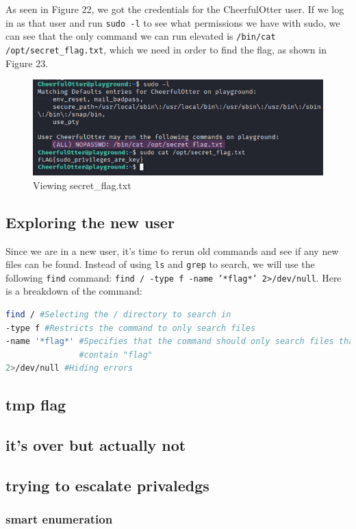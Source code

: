 \documentclass[a4paper]{article}
\newcommand{\abc}{\hfill \break}
\begin{document}
As seen in Figure 22, we got the credentials for the CheerfulOtter user. If we log in as that user and run \texttt{sudo -l} to see what permissions we have with sudo, we can see that the only command we can run elevated is \texttt{/bin/cat /opt/secret\_flag.txt}, which we need in order to find the flag, as shown in Figure 23.
\begin{figure}[h]
	\includegraphics[scale=0.45]{images/sh.png}
	\centering
	\caption{Viewing secret\_flag.txt}
\end{figure}\abc
\subsection{Exploring the new user}
Since we are in a new user, it's time to rerun old commands and see if any new files can be found. Instead of using \texttt{ls} and \texttt{grep} to search, we will use the following \texttt{find} command: \texttt{find / -type f -name '*flag*' 2>/dev/null}. Here is a breakdown of the command:
\begin{lstlisting}[language=bash]
find / #Selecting the / directory to search in
-type f #Restricts the command to only search files
-name '*flag*' #Specifies that the command should only search files that 
               #contain "flag"
2>/dev/null #Hiding errors
\end{lstlisting}
\subsection{tmp flag}
\subsection{it's over but actually not}
\subsection{trying to escalate privaledgs}
\subsubsection{smart enumeration}
\end{document}
